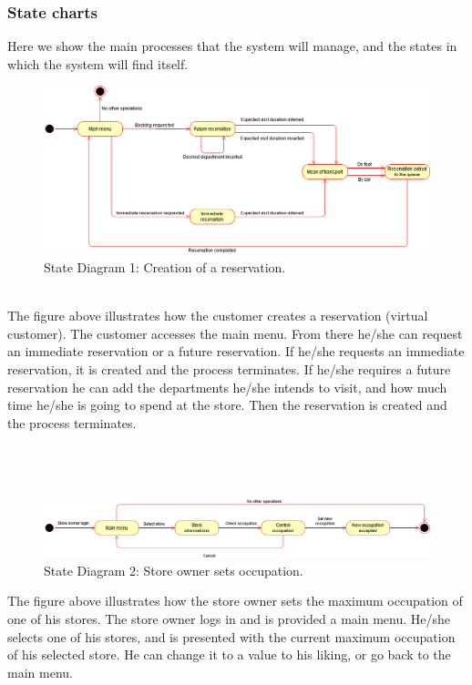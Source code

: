 \subsubsection{State charts}
Here we show the main processes that the system will manage, and the states in which the system will find itself.
\begin{figure}[!htb]
	\centering
	\includegraphics[width=\textwidth]{Images/StateDiagram1.png}
	\caption{\label{fig:metamodel3}State Diagram 1: Creation of a reservation.}
\end{figure}\\
The figure above illustrates how the customer creates a reservation (virtual customer). The customer accesses the main menu. From there he/she can request an immediate reservation or a future reservation. If he/she requests an immediate reservation, it is created and the process terminates. If he/she requires a future reservation he can add the departments he/she intends to visit, and how much time he/she is going to spend at the store. Then the reservation is created and the process terminates.\\\\\\\\

\begin{figure}[!htb]
	\centering
	\includegraphics[width=\textwidth]{Images/StateDiagram2.png}
	\caption{State Diagram 2: Store owner sets occupation.}
\end{figure}
The figure above illustrates how the store owner sets the maximum occupation of one of his stores. The store owner logs in and is provided a main menu. He/she selects one of his stores, and is presented with the current maximum occupation of his selected store. He can change it to a value to his liking, or go back to the main menu.
\newpage

